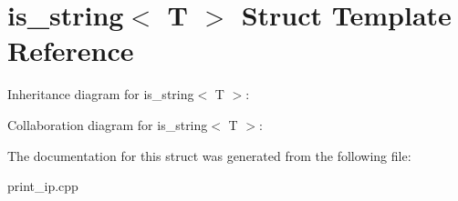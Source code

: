 \hypertarget{structis__string}{}\section{is\+\_\+string$<$ T $>$ Struct Template Reference}
\label{structis__string}


Inheritance diagram for is\+\_\+string$<$ T $>$\+:


Collaboration diagram for is\+\_\+string$<$ T $>$\+:


The documentation for this struct was generated from the following file\+:\begin{DoxyCompactItemize}
\item 
print\+\_\+ip.\+cpp\end{DoxyCompactItemize}
